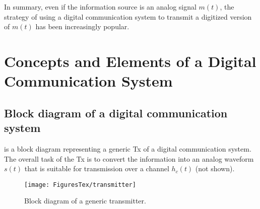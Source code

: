 In summary, even if the information source is an analog signal $m(t)$, the strategy of using a digital communication system to transmit a digitized version of $m(t)$ has been increasingly popular. 

\section{Concepts and Elements of a Digital Communication System}
\label{sec:elements_digitalComm}

\subsection{Block diagram of a digital communication system}

 is a block diagram representing a generic Tx of a digital communication system.
The overall task of the Tx is to convert the information into an analog waveform $s(t)$ that is suitable for transmission over a channel $h_c(t)$ (not shown). 

\begin{figure}[htbp]
	\centering
		\texttt{[image: FiguresTex/transmitter]}		
	\caption{Block diagram of a generic transmitter.\label{fig:transmitter}}
\end{figure}

